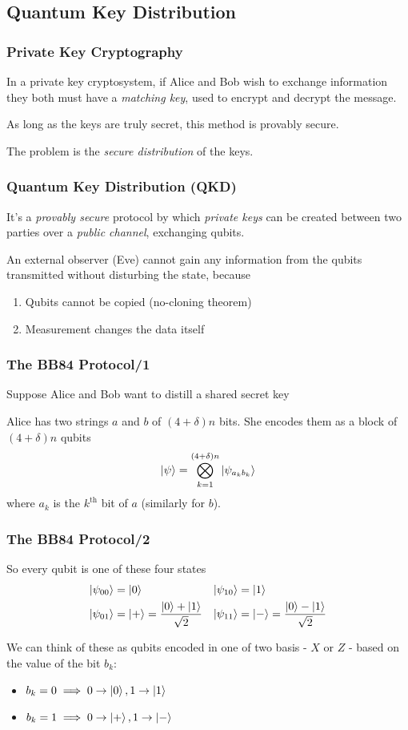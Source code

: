 \documentclass{beamer}
\begin{document}
  \subsection{Quantum Key Distribution}
  \begin{frame}
    \frametitle{Private Key Cryptography}
    In a private key cryptosystem, if Alice and Bob wish to exchange information they
    both must have a \textit{matching key}, used to encrypt and decrypt the message.

    As long as the keys are truly secret, this method is provably secure.

    The problem is the \textit{secure distribution}
    of the keys.
  \end{frame}
  \begin{frame}
    \frametitle{Quantum Key Distribution (QKD)}
    It's a \textit{provably secure} protocol by which \textit{private keys} can be created
    between two parties over a \textit{public channel}, exchanging qubits.

    An external observer (Eve) cannot gain any information from the qubits
    transmitted without disturbing the state, because
    \begin{enumerate}
      \item Qubits cannot be copied (no-cloning theorem)
      \item Measurement changes the data itself
    \end{enumerate}
  \end{frame}
  \begin{frame}
    \frametitle{The BB84 Protocol/1}
    Suppose Alice and Bob want to distill a shared secret key
    
    Alice has two strings $a$ and $b$ of $(4+\delta)n$ bits.
    She encodes them as a block of $(4+\delta)n$ qubits
    \begin{equation*}
      \ket{\psi} = \bigotimes_{k=1}^{(4+\delta)n} \ket{\psi_{a_kb_k}}
    \end{equation*}
    where $a_k$ is the $k^\text{th}$ bit of $a$ (similarly for $b$).
  \end{frame}

  \begin{frame}
    \frametitle{The BB84 Protocol/2}
    So every qubit is one of these four states
    \begin{align*}
      \ket{\psi_{00}} &= \ket{0} & \ket{\psi_{10}} &= \ket{1} \\
      \ket{\psi_{01}} &= \ket{+} = \frac{\ket0 + \ket1}{\sqrt2} &\ket{\psi_{11}} &= \ket{-} = \frac{\ket0 - \ket1}{\sqrt2}
    \end{align*}

    We can think of these as qubits encoded in one of two basis - $X$ or $Z$ - based
    on the value of the bit $b_k$:
    \begin{itemize}
      \item $b_k = 0 \implies 0 \to \ket0, 1 \to \ket1$
      \item $b_k = 1 \implies 0 \to \ket{+}, 1 \to \ket{-}$
    \end{itemize}
  \end{frame}
\end{document}

